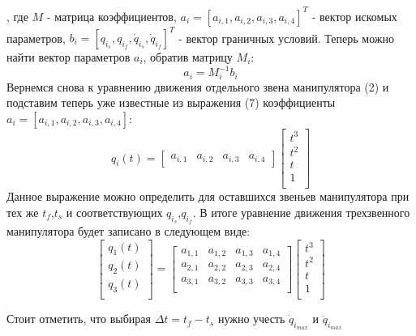 , где $M$ - матрица коэффициентов, $a_i=[a_{i,1}, a_{i,2}, a_{i,3}, a_{i,4}]^T$ - вектор искомых параметров,  $b_i=[q_{i_{s}}, q_{i_{f}}, \dot{q}_{i_{s}}, \dot{q}_{i_{f}}]^T$ - вектор граничных условий.
Теперь можно найти вектор параметров $a_i$, обратив матрицу $M_i$:
\begin{equation}\label{eq:model}
a_i = M_i^{-1} b_i 
\end{equation}
Вернемся снова к уравнению движения отдельного звена манипулятора (2) и подставим теперь уже известные из выражения (7) коэффициенты $a_i=[a_{i,1}, a_{i,2}, a_{i,3}, a_{i,4}]$:
\begin{equation}\label{eq:model}
q_i(t)=
    \begin{bmatrix}
    a_{i,1} & a_{i,2} & a_{i,3} & a_{i,4}
    \end{bmatrix}
    \begin{bmatrix}
    t^3\\
    t^2\\
    t\\
    1\\
    \end{bmatrix}
\end{equation}
Данное выражение можно определить для оставшихся звеньев манипулятора при тех же $t_f$,$t_s$ и соответствующих $q_{i_{s}}$,$q_{i_{f}}$.
В итоге уравнение движения трехзвенного манипулятора будет записано в следующем виде:
\begin{equation}\label{eq:model}
\begin{bmatrix}
    q_1(t)\\
    q_2(t)\\
    q_3(t)\\
\end{bmatrix}
    =
\begin{bmatrix}
    a_{1,1} & a_{1,2} & a_{1,3} & a_{1,4}\\
    a_{2,1} & a_{2,2} & a_{2,3} & a_{2,4}\\
    a_{3,1} & a_{3,2} & a_{3,3} & a_{3,4}\\
\end{bmatrix}
\begin{bmatrix}
    t^3\\
    t^2\\
    t\\
    1\\
    \end{bmatrix}
\end{equation}

Стоит отметить, что выбирая $\Delta t=t_f - t_s$ нужно учесть $\dot{q}_{i_{max}}$ и $\ddot{q}_{i_{max}}$

